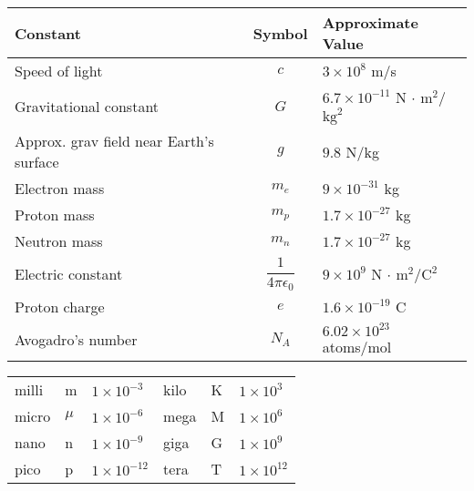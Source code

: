 \begin{tabular}{lcl}
	Constant & Symbol & Approximate Value \\ \hline
	Speed of light & $c$ & $3 \times 10^8$ m/s \\
	Gravitational constant & $G$ & $6.7 \times 10^{-11}$ N $\cdot \text{ m}^2$/$\text{kg}^2$\\
	Approx. grav field near Earth's surface & $g$ & $9.8$ N/kg\\
	Electron mass & $m_e$ & $9 \times 10^{-31}$ kg \\
	Proton mass & $m_p$ & $1.7 \times 10^{-27}$ kg \\
	Neutron mass & $m_n$ & $1.7 \times 10^{-27}$ kg \\
	Electric constant & $\dfrac{1}{4 \pi \epsilon_0}$ & $9 \times 10^9$ N $\cdot \text{ m}^2$/$\text{C}^2$\\
	Proton charge & $e$ & $1.6 \times 10^{-19}$ C \\
	Avogadro's number & $N_A$ & $6.02 \times 10^{23}$ atoms/mol \\
	\hline
\end{tabular}

\vspace{.2in}
\begin{tabular} {lll|lll}
	milli & m & $1 \times 10^{-3}$ \hspace*{0.5in} & \hspace{0.5in} kilo & K & $1 \times 10^{3}$\\
	micro & $\mu$ & $1 \times 10^{-6}$ &  \hspace{0.5in} mega & M & $1 \times 10^{6}$\\
	nano & n &$1 \times 10^{-9}$ &  \hspace{0.5in} giga & G & $1 \times 10^{9}$\\
	pico & p & $1 \times 10^{-12}$ &  \hspace{0.5in} tera & T & $1 \times 10^{12}$ \\
\end{tabular}
